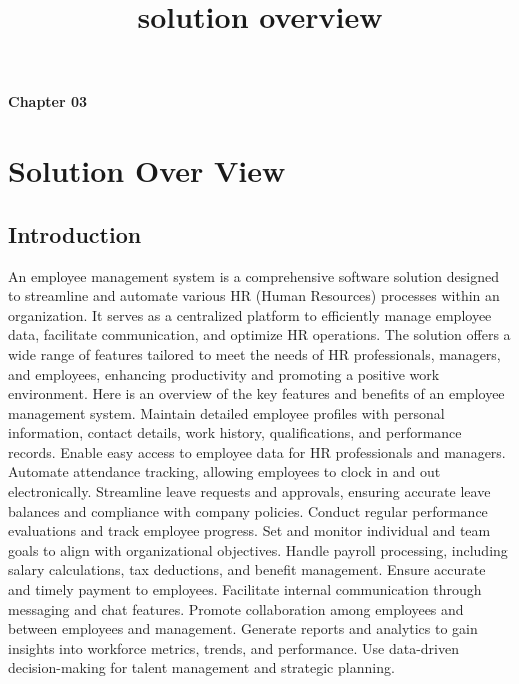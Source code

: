 \title{solution overview}
\begin{center}
\textbf{Chapter 03}\\
\vspace{2.5mm}
   \section{ \large \textbf{Solution Over View}}
\end{center}
\vspace{5.5mm}
    \subsection{Introduction}
    An employee management system is a comprehensive software solution designed to
streamline and automate various HR (Human Resources) processes within an organization.
It serves as a centralized platform to efficiently manage employee data, facilitate
communication, and optimize HR operations. The solution offers a wide range of features
tailored to meet the needs of HR professionals, managers, and employees, enhancing
productivity and promoting a positive work environment. Here is an overview of the key
features and benefits of an employee management system. Maintain detailed employee
profiles with personal information, contact details, work history, qualifications, and
performance records. Enable easy access to employee data for HR professionals and
managers. Automate attendance tracking, allowing employees to clock in and out
electronically. Streamline leave requests and approvals, ensuring accurate leave balances
and compliance with company policies. Conduct regular performance evaluations and track
employee progress. Set and monitor individual and team goals to align with organizational
objectives. Handle payroll processing, including salary calculations, tax deductions, and
benefit management. Ensure accurate and timely payment to employees. Facilitate internal
communication through messaging and chat features. Promote collaboration among
employees and between employees and management. Generate reports and analytics to gain
insights into workforce metrics, trends, and performance. Use data-driven decision-making
for talent management and strategic planning.
\newpage
